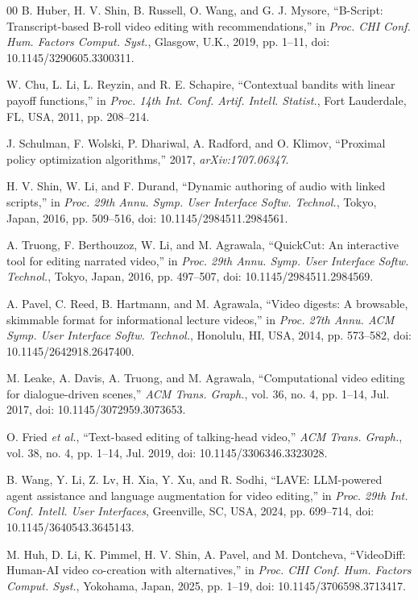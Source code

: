 \documentclass{ieeeaccess}
\begin{document}
\begin{thebibliography}{00}
 B. Huber, H. V. Shin, B. Russell, O. Wang, and G. J. Mysore, ``B-Script: Transcript-based B-roll video editing with recommendations,'' in \emph{Proc. CHI Conf. Hum. Factors Comput. Syst.}, Glasgow, U.K., 2019, pp. 1--11, doi: 10.1145/3290605.3300311.

 W. Chu, L. Li, L. Reyzin, and R. E. Schapire, ``Contextual bandits with linear payoff functions,'' in \emph{Proc. 14th Int. Conf. Artif. Intell. Statist.}, Fort Lauderdale, FL, USA, 2011, pp. 208--214.

 J. Schulman, F. Wolski, P. Dhariwal, A. Radford, and O. Klimov, ``Proximal policy optimization algorithms,'' 2017, \emph{arXiv:1707.06347}.

 H. V. Shin, W. Li, and F. Durand, ``Dynamic authoring of audio with linked scripts,'' in \emph{Proc. 29th Annu. Symp. User Interface Softw. Technol.}, Tokyo, Japan, 2016, pp. 509--516, doi: 10.1145/2984511.2984561.

 A. Truong, F. Berthouzoz, W. Li, and M. Agrawala, ``QuickCut: An interactive tool for editing narrated video,'' in \emph{Proc. 29th Annu. Symp. User Interface Softw. Technol.}, Tokyo, Japan, 2016, pp. 497--507, doi: 10.1145/2984511.2984569.

 A. Pavel, C. Reed, B. Hartmann, and M. Agrawala, ``Video digests: A browsable, skimmable format for informational lecture videos,'' in \emph{Proc. 27th Annu. ACM Symp. User Interface Softw. Technol.}, Honolulu, HI, USA, 2014, pp. 573--582, doi: 10.1145/2642918.2647400.

 M. Leake, A. Davis, A. Truong, and M. Agrawala, ``Computational video editing for dialogue-driven scenes,'' \emph{ACM Trans. Graph.}, vol. 36, no. 4, pp. 1--14, Jul. 2017, doi: 10.1145/3072959.3073653.

 O. Fried \emph{et al.}, ``Text-based editing of talking-head video,'' \emph{ACM Trans. Graph.}, vol. 38, no. 4, pp. 1--14, Jul. 2019, doi: 10.1145/3306346.3323028.

 B. Wang, Y. Li, Z. Lv, H. Xia, Y. Xu, and R. Sodhi, ``LAVE: LLM-powered agent assistance and language augmentation for video editing,'' in \emph{Proc. 29th Int. Conf. Intell. User Interfaces}, Greenville, SC, USA, 2024, pp. 699--714, doi: 10.1145/3640543.3645143.

 M. Huh, D. Li, K. Pimmel, H. V. Shin, A. Pavel, and M. Dontcheva, ``VideoDiff: Human-AI video co-creation with alternatives,'' in \emph{Proc. CHI Conf. Hum. Factors Comput. Syst.}, Yokohama, Japan, 2025, pp. 1--19, doi: 10.1145/3706598.3713417.


\end{thebibliography}
\end{document}
